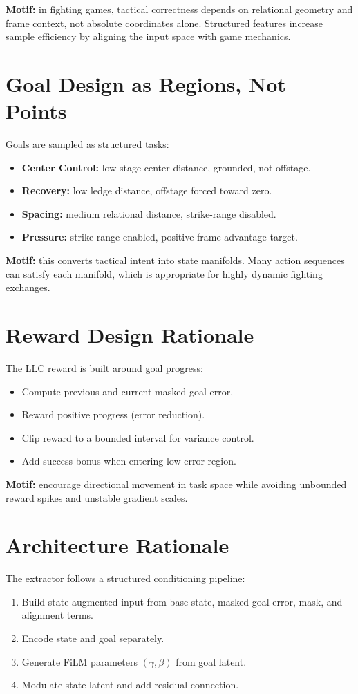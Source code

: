 \documentclass[11pt,a4paper]{article}
\begin{document}
\textbf{Motif:} in fighting games, tactical correctness depends on relational geometry and frame context, not absolute coordinates alone. Structured features increase sample efficiency by aligning the input space with game mechanics.

\section{Goal Design as Regions, Not Points}
Goals are sampled as structured tasks:
\begin{itemize}[leftmargin=1.5em]
    \item \textbf{Center Control:} low stage-center distance, grounded, not offstage.
    \item \textbf{Recovery:} low ledge distance, offstage forced toward zero.
    \item \textbf{Spacing:} medium relational distance, strike-range disabled.
    \item \textbf{Pressure:} strike-range enabled, positive frame advantage target.
\end{itemize}

\textbf{Motif:} this converts tactical intent into state manifolds. Many action sequences can satisfy each manifold, which is appropriate for highly dynamic fighting exchanges.

\section{Reward Design Rationale}
The LLC reward is built around goal progress:
\begin{itemize}[leftmargin=1.5em]
    \item Compute previous and current masked goal error.
    \item Reward positive progress (error reduction).
    \item Clip reward to a bounded interval for variance control.
    \item Add success bonus when entering low-error region.
\end{itemize}

\textbf{Motif:} encourage directional movement in task space while avoiding unbounded reward spikes and unstable gradient scales.

\section{Architecture Rationale}
The extractor follows a structured conditioning pipeline:
\begin{enumerate}[leftmargin=1.5em]
    \item Build state-augmented input from base state, masked goal error, mask, and alignment terms.
    \item Encode state and goal separately.
    \item Generate FiLM parameters $(\gamma,\beta)$ from goal latent.
    \item Modulate state latent and add residual connection.
\end{enumerate}
\end{document}
